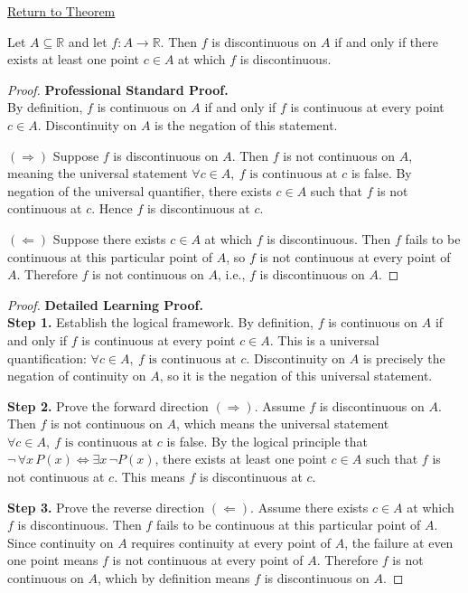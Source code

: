 \newpage
{}
\label{prf:discontinuity-on-set}

\begin{remark*}[Return]
\hyperref[prop:discontinuity-on-set]{Return to Theorem}
\end{remark*}

\begin{theorem*}
Let $A \subseteq \mathbb{R}$ and let $f : A \to \mathbb{R}$. Then $f$ is discontinuous on $A$ if and only if there exists at least one point $c \in A$ at which $f$ is discontinuous.
\end{theorem*}

\begin{proof}
\textbf{Professional Standard Proof.}~\\
By definition, $f$ is continuous on $A$ if and only if $f$ is continuous at every point $c \in A$. Discontinuity on $A$ is the negation of this statement.

$(\Rightarrow)$ Suppose $f$ is discontinuous on $A$. Then $f$ is not continuous on $A$, meaning the universal statement $\forall c \in A,\ f \text{ is continuous at } c$ is false. By negation of the universal quantifier, there exists $c \in A$ such that $f$ is not continuous at $c$. Hence $f$ is discontinuous at $c$.

$(\Leftarrow)$ Suppose there exists $c \in A$ at which $f$ is discontinuous. Then $f$ fails to be continuous at this particular point of $A$, so $f$ is not continuous at every point of $A$. Therefore $f$ is not continuous on $A$, i.e., $f$ is discontinuous on $A$.
\end{proof}

\begin{proof}
\textbf{Detailed Learning Proof.}~\\

\textbf{Step 1.} Establish the logical framework. By definition, $f$ is continuous on $A$ if and only if $f$ is continuous at every point $c \in A$. This is a universal quantification: $\forall c \in A,\ f \text{ is continuous at } c$. Discontinuity on $A$ is precisely the negation of continuity on $A$, so it is the negation of this universal statement.

\textbf{Step 2.} Prove the forward direction $(\Rightarrow)$. Assume $f$ is discontinuous on $A$. Then $f$ is not continuous on $A$, which means the universal statement $\forall c \in A,\ f \text{ is continuous at } c$ is false. By the logical principle that $\lnot\,\forall x\,P(x) \iff \exists x\,\lnot P(x)$, there exists at least one point $c \in A$ such that $f$ is not continuous at $c$. This means $f$ is discontinuous at $c$.

\textbf{Step 3.} Prove the reverse direction $(\Leftarrow)$. Assume there exists $c \in A$ at which $f$ is discontinuous. Then $f$ fails to be continuous at this particular point of $A$. Since continuity on $A$ requires continuity at every point of $A$, the failure at even one point means $f$ is not continuous at every point of $A$. Therefore $f$ is not continuous on $A$, which by definition means $f$ is discontinuous on $A$.
\end{proof}

